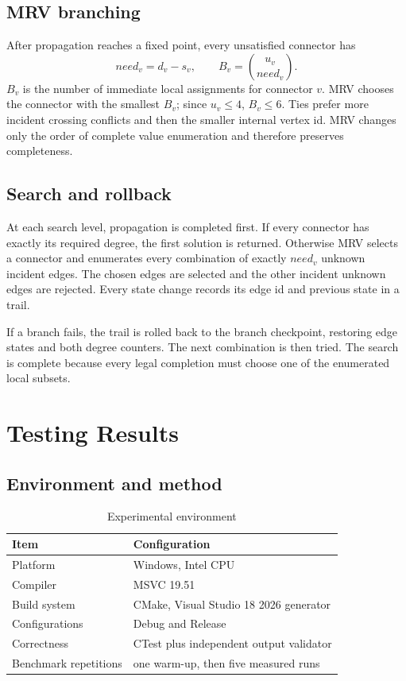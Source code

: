 \documentclass[11pt,a4paper]{article}
\begin{document}
\subsection{MRV branching}

After propagation reaches a fixed point, every unsatisfied connector has
\begin{equation}
  \mathit{need}_v = d_v-s_v,\qquad
  B_v=\binom{u_v}{\mathit{need}_v}.
\end{equation}
$B_v$ is the number of immediate local assignments for connector $v$. MRV
chooses the connector with the smallest $B_v$; since $u_v\le4$, $B_v\le6$.
Ties prefer more incident crossing conflicts and then the smaller internal
vertex id. MRV changes only the order of complete value enumeration and
therefore preserves completeness.

\subsection{Search and rollback}

At each search level, propagation is completed first. If every connector has
exactly its required degree, the first solution is returned. Otherwise MRV
selects a connector and enumerates every combination of exactly
$\mathit{need}_v$ unknown incident edges. The chosen edges are selected and the
other incident unknown edges are rejected. Every state change records its edge
id and previous state in a trail.

If a branch fails, the trail is rolled back to the branch checkpoint, restoring
edge states and both degree counters. The next combination is then tried. The
search is complete because every legal completion must choose one of the
enumerated local subsets.

\section{Testing Results}

\subsection{Environment and method}

\begin{table}[H]
\centering
\caption{Experimental environment}
\begin{tabular}{ll}
\toprule
Item & Configuration \\
\midrule
Platform & Windows, Intel CPU \\
Compiler & MSVC 19.51 \\
Build system & CMake, Visual Studio 18 2026 generator \\
Configurations & Debug and Release \\
Correctness & CTest plus independent output validator \\
Benchmark repetitions & one warm-up, then five measured runs \\
\bottomrule
\end{tabular}
\end{table}
\end{document}
